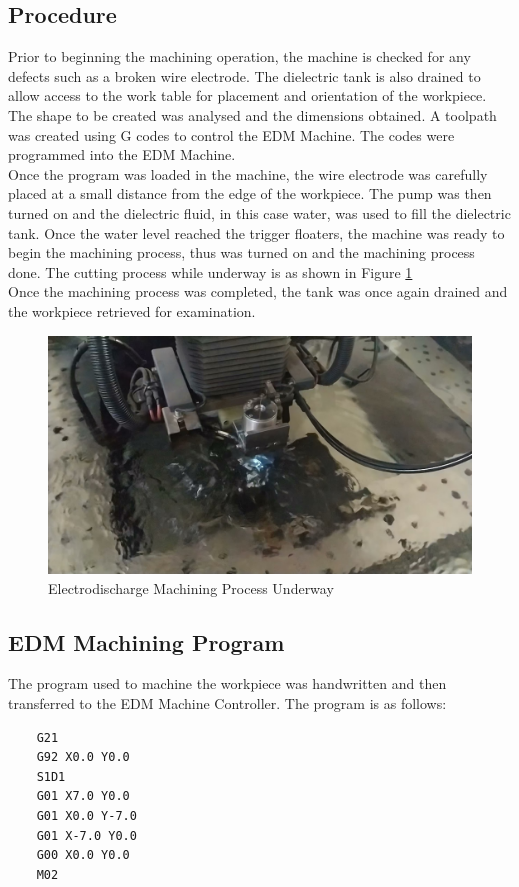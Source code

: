 \subsection{Procedure}
Prior to beginning the machining operation, the machine is checked for any defects such as a broken wire electrode. The dielectric tank is also drained to allow access to the work table for placement and orientation of the workpiece.\\
The shape to be created was analysed and the dimensions obtained. A toolpath was created using G codes to control the EDM Machine. The codes were programmed into the EDM Machine.\\
Once the program was loaded in the machine, the wire electrode was carefully placed at a small distance from the edge of the workpiece. The pump was then turned on and the dielectric fluid, in this case water, was used to fill the dielectric tank. Once the water level reached the trigger floaters, the machine was ready to begin the machining process, thus was turned on and the machining process done. The cutting process while underway is as shown in Figure \ref{fig:cutting}\\
Once the machining process was completed, the tank was once again drained and the workpiece retrieved for examination.
\begin{figure}[h!]
	\centering
	\includegraphics[width=0.7\linewidth]{Figures/edmmachining}
	\caption[EDM Machining Process]{Electrodischarge Machining Process Underway}
	\label{fig:cutting}
\end{figure}
\newpage
\subsection{EDM Machining Program}
The program used to machine the workpiece was  handwritten and then transferred to the EDM Machine Controller. The program is as follows:
\\
\begin{verbatim}
	G21
	G92 X0.0 Y0.0
	S1D1
	G01 X7.0 Y0.0
	G01 X0.0 Y-7.0
	G01 X-7.0 Y0.0
	G00 X0.0 Y0.0
	M02
\end{verbatim}
